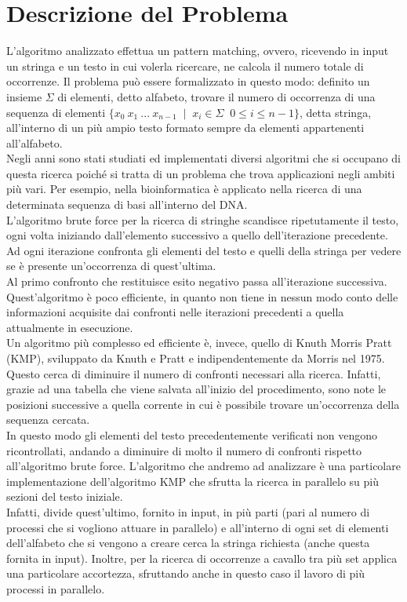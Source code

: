 \chapter{Descrizione del Problema}
L'algoritmo analizzato effettua un pattern matching, ovvero, ricevendo in input un stringa e un testo in cui volerla ricercare, ne calcola il numero totale di occorrenze. Il problema può essere formalizzato in questo modo: definito un insieme $\Sigma$ di elementi, detto alfabeto, trovare il numero di occorrenza di una sequenza di elementi $\{x_0\:x_1\: ...\:x_{n-1} \;\; | \;\; x_i \in \Sigma\;\; 0\le i \le n-1\}$, detta stringa, all'interno di un più ampio testo formato sempre da elementi appartenenti all'alfabeto.\\
Negli anni sono stati studiati ed implementati diversi algoritmi che si occupano di questa ricerca poiché si tratta di un problema che trova applicazioni negli ambiti più vari. Per esempio, nella bioinformatica è applicato nella ricerca di una determinata sequenza di basi all'interno del DNA.\\
L'algoritmo brute force per la ricerca di stringhe scandisce ripetutamente il testo, ogni volta iniziando dall'elemento successivo a quello dell'iterazione precedente. Ad ogni iterazione confronta gli elementi del testo e quelli della stringa per vedere se è presente un'occorrenza di quest'ultima. \\
Al primo confronto che restituisce esito negativo passa all'iterazione successiva. Quest'algoritmo è poco efficiente, in quanto non tiene in nessun modo conto delle informazioni acquisite dai confronti nelle iterazioni precedenti a quella attualmente in esecuzione.\\
Un algoritmo più complesso ed efficiente è, invece, quello di Knuth Morris Pratt (KMP), sviluppato da Knuth e Pratt e indipendentemente da Morris nel 1975. Questo cerca di diminuire il numero di confronti necessari alla ricerca. Infatti, grazie ad una tabella che viene salvata all'inizio del procedimento, sono note le posizioni successive a quella corrente in cui è possibile trovare un'occorrenza della sequenza cercata. \\
In questo modo gli elementi del testo precedentemente verificati non vengono ricontrollati, andando a diminuire di molto il numero di confronti rispetto all'algoritmo brute force.
L'algoritmo che andremo ad analizzare è una particolare implementazione dell'algoritmo KMP che sfrutta la ricerca in parallelo su più sezioni del testo iniziale. \\
Infatti, divide quest'ultimo, fornito in input, in più parti (pari al numero di processi che si vogliono attuare in parallelo) e all'interno di ogni set di elementi dell'alfabeto che si vengono a creare cerca la stringa richiesta (anche questa fornita in input). Inoltre, per la ricerca di occorrenze a cavallo tra più set applica una particolare accortezza, sfruttando anche in questo caso il lavoro di più processi in parallelo. 